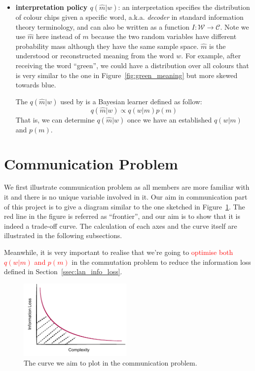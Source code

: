 \documentclass[11pt]{article}
\begin{document}
\begin{itemize}[leftmargin=*]
    \item \textbf{interpretation policy $q(\hat{m}|w)$\label{par:decoder}}: an interpretation specifies the distribution of colour chips given a specific word, a.k.a. \emph{decoder} in standard information theory terminology, and can also be written as a function $I:\mathcal{W}\rightarrow\mathcal{C}$.
    Note we use $\hat{m}$ here instead of $m$ because the two random variables have different probability mass although they have the same sample space. 
    $\hat{m}$ is the understood or reconstructed meaning from the word $w$.
    For example, after receiving the word ``green'', we could have a distribution over all colours that is very similar to the one in Figure~\ref{fig:green_meaning} but more skewed towards blue.
    
    The $q(\hat{m}|w)$ used by \citet{zaslavsky2018efficient} is a Bayesian learner defined as follow:
    \begin{equation}
        q(\hat{m}|w) \propto q(w|m)p(m)
        \label{eq:bayesian_interpretation}
    \end{equation}
    That is, we can determine $q(\hat{m}|w)$ once we have an established $q(w|m)$ and $p(m)$.
    
    
\end{itemize}

\section{Communication Problem}
\label{sec:comm}

We first illustrate communication problem as all members are more familiar with it and there is no unique variable involved in it.
Our aim in communication part of this project is to give a diagram similar to the one sketched in Figure~\ref{fig:curve_comm}.
The red line in the figure is referred as ``frontier'', and our aim is to show that it is indeed a trade-off curve.
The calculation of each axes and the curve itself are illustrated in the following subsections.

Meanwhile, it is very important to realise that we're going to \textcolor{red}{optimise both $q(w|m)$ and $p(m)$} in the commutation problem to reduce the information loss defined in Section~\ref{ssec:lan_info_loss}.

\begin{figure}[t]
    \centering
    \includegraphics[width=0.49\textwidth]{docs/intro_rate_distortion/graphs/communication_curve.pdf}
    \caption{The curve we aim to plot in the communication problem.}
    \label{fig:curve_comm}
\end{figure}
\end{document}
